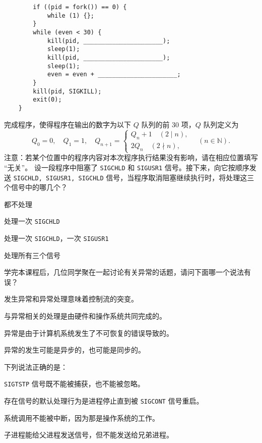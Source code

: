 \begin{problems}
\begin{verbatim}
        if ((pid = fork()) == 0) {
            while (1) {};
        }
        while (even < 30) {
            kill(pid, ______________________);
            sleep(1);
            kill(pid, ______________________);
            sleep(1);
            even = even + ______________________;
        }
        kill(pid, SIGKILL);
        exit(0);
    }
        \end{verbatim}
        完成程序，使得程序在输出的数字为以下 $Q$ 队列的前 30 项，$Q$ 队列定义为
        \[ Q_0=0, \quad Q_1=1, \quad Q_{n+1} = \begin{cases}
            Q_n+1 \quad (2 \mid n), \\
            2Q_n \quad (2 \nmid n),
        \end{cases} \quad (n \in \mathbb N). \]
        注意：若某个位置中的程序内容对本次程序执行结果没有影响，请在相应位置填写 “无关”。
         设一段程序中阻塞了 \verb|SIGCHLD| 和 \verb|SIGUSR1| 信号。接下来，向它按顺序发送 \verb|SIGCHLD, SIGUSR1, SIGCHLD| 信号，当程序取消阻塞继续执行时，将处理这三个信号中的哪几个？
        \begin{choices}
            \item 都不处理
            \item 处理一次 \verb|SIGCHLD|
            \item 处理一次 \verb|SIGCHLD|，一次 \verb|SIGUSR1|
            \item 处理所有三个信号
        \end{choices}
         学完本课程后，几位同学聚在一起讨论有关异常的话题，请问下面哪一个说法有误？
        \begin{choices}
            \item 发生异常和异常处理意味着控制流的突变。
            \item 与异常相关的处理是由硬件和操作系统共同完成的。
            \item 异常是由于计算机系统发生了不可恢复的错误导致的。
            \item 异常的发生可能是异步的，也可能是同步的。
        \end{choices}
         下列说法正确的是：
        \begin{choices}
            \item \verb|SIGTSTP| 信号既不能被捕获，也不能被忽略。
            \item 存在信号的默认处理行为是进程停止直到被 \verb|SIGCONT| 信号重启。
            \item 系统调用不能被中断，因为那是操作系统的工作。
            \item 子进程能给父进程发送信号，但不能发送给兄弟进程。

\end{choices}
\end{problems}
